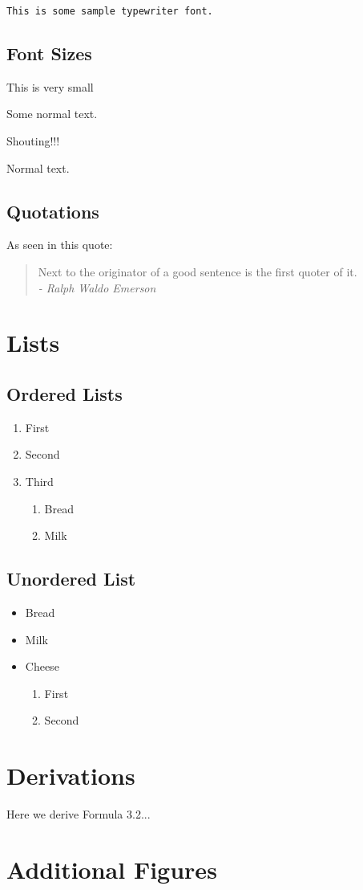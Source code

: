 \documentclass[a4paper]{article}
\begin{document}
{\tt This is some sample typewriter font.}

\subsection{Font Sizes}
{\tiny This is very small} \\
\begin{normalsize}
Some normal text. \\
\end{normalsize}
\begin{huge}
Shouting!!!
\end{huge}

Normal text. 

\subsection{Quotations}
As seen in this quote:

\begin{quote}
	Next to the originator of a good sentence
	is the first quoter of it. \\
	\textit{- Ralph Waldo Emerson}
\end{quote}

\section{Lists}
\subsection{Ordered Lists}
\begin{enumerate}
	\item First
	\item Second
	\item Third
	\begin{enumerate}
		\item Bread
		\item Milk
	\end{enumerate}
\end{enumerate}

\subsection{Unordered List}
\begin{itemize}
	\item Bread
	\item Milk
	\item Cheese
	\begin{enumerate}
		\item First
		\item Second
	\end{enumerate}
\end{itemize}



\appendix
\section{Derivations}
Here we derive Formula 3.2...

\section{Additional Figures}
\end{document}
